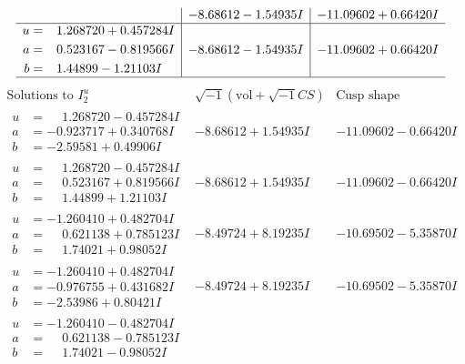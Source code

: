 \documentclass[1p]{elsarticle_modified}
\theoremstyle{definition}
\newcommand{\I}{\sqrt{-1}}
\begin{document}
$$\begin{array}{c|c|c}
 & -8.68612 - 1.54935 I & -11.09602 + 0.66420 I \\ \hline\begin{aligned}
u &= \phantom{-}1.268720 + 0.457284 I \\
a &= \phantom{-}0.523167 - 0.819566 I \\
b &= \phantom{-}1.44899 - 1.21103 I\end{aligned}
 & -8.68612 - 1.54935 I & -11.09602 + 0.66420 I\\
 \hline 
 \end{array}$$\newpage$$\begin{array}{c|c|c}  
\text{Solutions to }I^u_{2}& \I (\text{vol} + \sqrt{-1}CS) & \text{Cusp shape}\\
 \hline 
\begin{aligned}
u &= \phantom{-}1.268720 - 0.457284 I \\
a &= -0.923717 + 0.340768 I \\
b &= -2.59581 + 0.49906 I\end{aligned}
 & -8.68612 + 1.54935 I & -11.09602 - 0.66420 I \\ \hline\begin{aligned}
u &= \phantom{-}1.268720 - 0.457284 I \\
a &= \phantom{-}0.523167 + 0.819566 I \\
b &= \phantom{-}1.44899 + 1.21103 I\end{aligned}
 & -8.68612 + 1.54935 I & -11.09602 - 0.66420 I \\ \hline\begin{aligned}
u &= -1.260410 + 0.482704 I \\
a &= \phantom{-}0.621138 + 0.785123 I \\
b &= \phantom{-}1.74021 + 0.98052 I\end{aligned}
 & -8.49724 + 8.19235 I & -10.69502 - 5.35870 I \\ \hline\begin{aligned}
u &= -1.260410 + 0.482704 I \\
a &= -0.976755 + 0.431682 I \\
b &= -2.53986 + 0.80421 I\end{aligned}
 & -8.49724 + 8.19235 I & -10.69502 - 5.35870 I \\ \hline\begin{aligned}
u &= -1.260410 - 0.482704 I \\
a &= \phantom{-}0.621138 - 0.785123 I \\
b &= \phantom{-}1.74021 - 0.98052 I\end{aligned}

\end{array}$$
\end{document}
